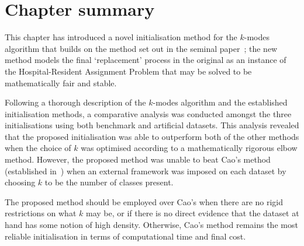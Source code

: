 \section{Chapter summary}\label{sec:summary}

This chapter has introduced a novel initialisation method for the \(k\)-modes
algorithm that builds on the method set out in the seminal
paper~\cite{Huang1998}; the new method models the final `replacement' process in
the original as an instance of the Hospital-Resident Assignment Problem that may
be solved to be mathematically fair and stable.

Following a thorough description of the \(k\)-modes algorithm and the
established initialisation methods, a comparative analysis was conducted amongst
the three initialisations using both benchmark and artificial datasets. This
analysis revealed that the proposed initialisation was able to outperform both
of the other methods when the choice of \(k\) was optimised according to a
mathematically rigorous elbow method. However, the proposed method was unable to
beat Cao's method (established in~\cite{Cao2009}) when an external framework was
imposed on each dataset by choosing \(k\) to be the number of classes present.

The proposed method should be employed over Cao's when there are no rigid
restrictions on what \(k\) may be, or if there is no direct evidence that the
dataset at hand has some notion of high density. Otherwise, Cao's method remains
the most reliable initialisation in terms of computational time and final cost.
